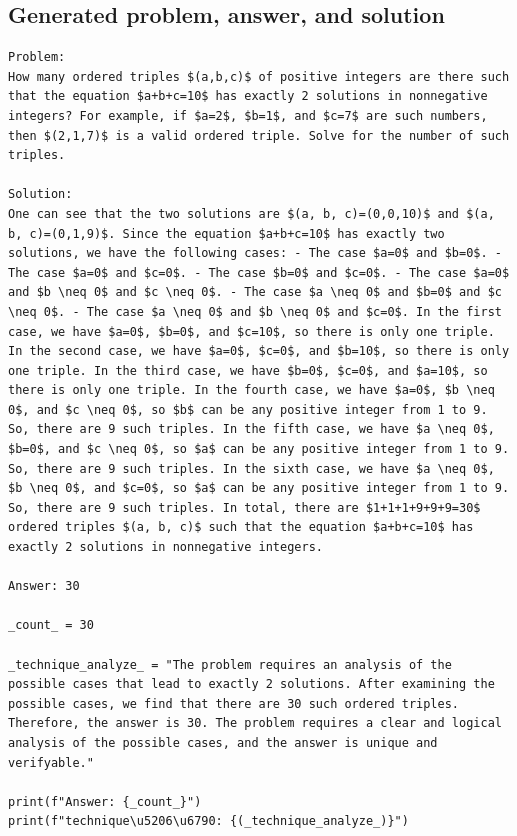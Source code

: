 \documentclass[11pt]{article}
\begin{document}
\subsection*{Generated problem, answer, and solution}
\begin{lstlisting}[style=modeloutput]
Problem:
How many ordered triples $(a,b,c)$ of positive integers are there such that the equation $a+b+c=10$ has exactly 2 solutions in nonnegative integers? For example, if $a=2$, $b=1$, and $c=7$ are such numbers, then $(2,1,7)$ is a valid ordered triple. Solve for the number of such triples.

Solution:
One can see that the two solutions are $(a, b, c)=(0,0,10)$ and $(a, b, c)=(0,1,9)$. Since the equation $a+b+c=10$ has exactly two solutions, we have the following cases: - The case $a=0$ and $b=0$. - The case $a=0$ and $c=0$. - The case $b=0$ and $c=0$. - The case $a=0$ and $b \neq 0$ and $c \neq 0$. - The case $a \neq 0$ and $b=0$ and $c \neq 0$. - The case $a \neq 0$ and $b \neq 0$ and $c=0$. In the first case, we have $a=0$, $b=0$, and $c=10$, so there is only one triple. In the second case, we have $a=0$, $c=0$, and $b=10$, so there is only one triple. In the third case, we have $b=0$, $c=0$, and $a=10$, so there is only one triple. In the fourth case, we have $a=0$, $b \neq 0$, and $c \neq 0$, so $b$ can be any positive integer from 1 to 9. So, there are 9 such triples. In the fifth case, we have $a \neq 0$, $b=0$, and $c \neq 0$, so $a$ can be any positive integer from 1 to 9. So, there are 9 such triples. In the sixth case, we have $a \neq 0$, $b \neq 0$, and $c=0$, so $a$ can be any positive integer from 1 to 9. So, there are 9 such triples. In total, there are $1+1+1+9+9+9=30$ ordered triples $(a, b, c)$ such that the equation $a+b+c=10$ has exactly 2 solutions in nonnegative integers.

Answer: 30

_count_ = 30

_technique_analyze_ = "The problem requires an analysis of the possible cases that lead to exactly 2 solutions. After examining the possible cases, we find that there are 30 such ordered triples. Therefore, the answer is 30. The problem requires a clear and logical analysis of the possible cases, and the answer is unique and verifyable."

print(f"Answer: {_count_}")
print(f"technique\u5206\u6790: {(_technique_analyze_)}")


\end{lstlisting}
\end{document}

